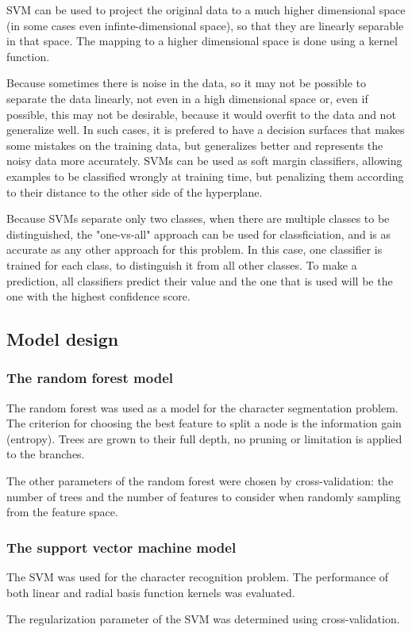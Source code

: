 SVM can be used to project the original data to a much higher dimensional space (in some cases even infinte-dimensional space), so that they are linearly separable in that space. The mapping to a higher dimensional space is done using a kernel function. 

Because sometimes there is noise in the data, so it may not be possible to separate the data linearly, not even in a high dimensional space or, even if possible, this may not be desirable, because it would overfit to the data and not generalize well. In such cases, it is prefered to have a decision surfaces that makes some mistakes on the training data, but generalizes better and represents the noisy data more accurately. SVMs can be used as soft margin classifiers, allowing examples to be classified wrongly at training time, but penalizing them according to their distance to the other side of the hyperplane. \cite{russell1995artificial}

Because SVMs separate only two classes, when there are multiple classes to be distinguished, the "one-vs-all" approach can be used for classficiation, and is as accurate as any other approach for this problem\cite{rifkin2004defense}. In this case, one classifier is trained for each class, to distinguish it from all other classes. To make a prediction, all classifiers predict their value and the one that is used will be the one with the highest confidence score.

\subsection{Model design}

\subsubsection{The random forest model}
The random forest was used as a model for the character segmentation problem. The criterion for choosing the best feature to split a node is the information gain (entropy). Trees are grown to their full depth, no pruning or limitation is applied to the branches. 

The other parameters of the random forest were chosen by cross-validation: the number of trees and the number of features to consider when randomly sampling from the feature space. 

\subsubsection{The support vector machine model}
The SVM was used for the character recognition problem. The performance of both linear and radial basis function kernels was evaluated. 

The regularization parameter of the SVM was determined using cross-validation. 
